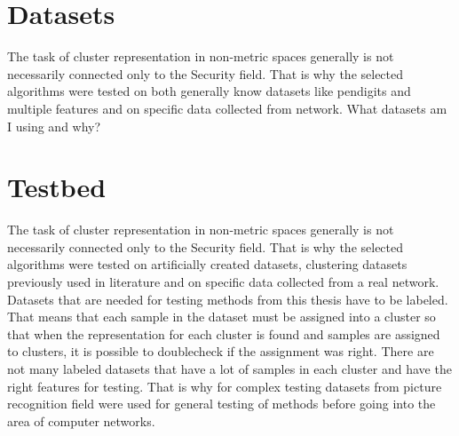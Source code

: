\documentclass[thesis=B,english]{FITthesis}[2012/10/20]
\begin{document}

\section{Datasets}
The task of cluster representation in non-metric spaces generally is not necessarily connected only to the Security field.
That is why the selected algorithms were tested on both generally know datasets like pendigits and multiple features and on specific data collected from network.
What datasets am I using and why?

\section{Testbed}

The task of cluster representation in non-metric spaces generally is not necessarily connected only to the Security field.
That is why the selected algorithms were tested on artificially created datasets, clustering datasets previously used in literature and on specific data collected from a real network.
Datasets that are needed for testing methods from this thesis have to be labeled.
That means that each sample in the dataset must be assigned into a cluster so that when the representation for each cluster is found and samples are assigned to clusters, it is possible to doublecheck if the assignment was right.
There are not many labeled datasets that have a lot of samples in each cluster and have the right features for testing. 
That is why for complex testing datasets from picture recognition field were used for general testing of methods before going into the area of computer networks.
\end{document}

